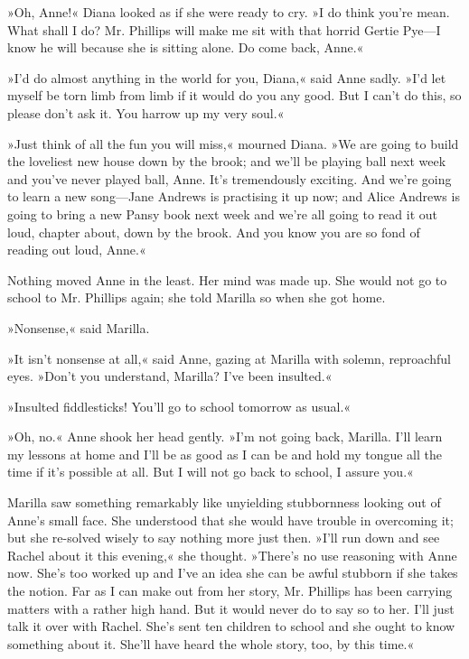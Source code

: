 »Oh, Anne!« Diana looked as if she were ready to cry. »I do think you're mean. What shall I do? Mr. Phillips will make me sit with that horrid Gertie Pye—I know he will because she is sitting alone. Do come back, Anne.«

»I'd do almost anything in the world for you, Diana,« said Anne sadly. »I'd let myself be torn limb from limb if it would do you any good. But I can't do this, so please don't ask it. You harrow up my very soul.«

»Just think of all the fun you will miss,« mourned Diana. »We are going to build the loveliest new house down by the brook; and we'll be playing ball next week and you've never played ball, Anne. It's tremendously exciting. And we're going to learn a new song—Jane Andrews is practising it up now; and Alice Andrews is going to bring a new Pansy book next week and we're all going to read it out loud, chapter about, down by the brook. And you know you are so fond of reading out loud, Anne.«

Nothing moved Anne in the least. Her mind was made up. She would not go to school to Mr. Phillips again; she told Marilla so when she got home.

»Nonsense,« said Marilla.

»It isn't nonsense at all,« said Anne, gazing at Marilla with solemn, reproachful eyes. »Don't you understand, Marilla? I've been insulted.«

»Insulted fiddlesticks! You'll go to school tomorrow as usual.«

»Oh, no.« Anne shook her head gently. »I'm not going back, Marilla. I'll learn my lessons at home and I'll be as good as I can be and hold my tongue all the time if it's possible at all. But I will not go back to school, I assure you.«

Marilla saw something remarkably like unyielding stubbornness looking out of Anne's small face. She understood that she would have trouble in overcoming it; but she re-solved wisely to say nothing more just then. »I'll run down and see Rachel about it this evening,« she thought. »There's no use reasoning with Anne now. She's too worked up and I've an idea she can be awful stubborn if she takes the notion. Far as I can make out from her story, Mr. Phillips has been carrying matters with a rather high hand. But it would never do to say so to her. I'll just talk it over with Rachel. She's sent ten children to school and she ought to know something about it. She'll have heard the whole story, too, by this time.«

